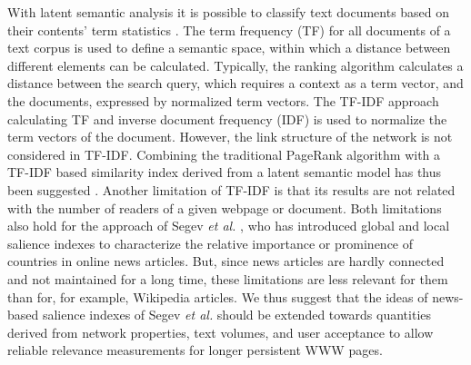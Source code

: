 \documentclass[a4paper,10pt]{scrbook}
\begin{document}
With latent semantic analysis it is possible to classify text documents based on
their contents' term statistics \cite{Gohr09topicevolution}. The term
frequency (TF)
for all documents of a text corpus is
used to define a semantic space, within which a distance between different
elements can be calculated. Typically, the ranking algorithm calculates a
distance between the search query, which requires a context as a term vector, and
the documents, expressed by normalized term vectors. The TF-IDF approach
\cite{Salton1988513} calculating TF and inverse document frequency (IDF) is used
to normalize the term vectors of the document.  However, the link structure of
the network is not considered in TF-IDF.  Combining the traditional PageRank 
algorithm with a TF-IDF based similarity index derived from a latent semantic 
model has thus been suggested \cite{5364637.LSPR}.
Another limitation of TF-IDF is that its results are not related with the number 
of readers of a given webpage or document. Both limitations also hold for the 
approach of Segev {\it et al.} \cite{Segev2010}, who has introduced global and 
local salience indexes to characterize the relative importance or prominence of 
countries in online news articles.  But, since news articles are hardly connected 
and not maintained for a long time, these limitations are less relevant for them 
than for, for example, Wikipedia articles.  We thus suggest that the ideas of 
news-based salience indexes of Segev {\it et al.} should be extended towards 
quantities derived from network properties, text volumes, and user acceptance to 
allow reliable relevance measurements for longer persistent WWW pages.
\end{document}
